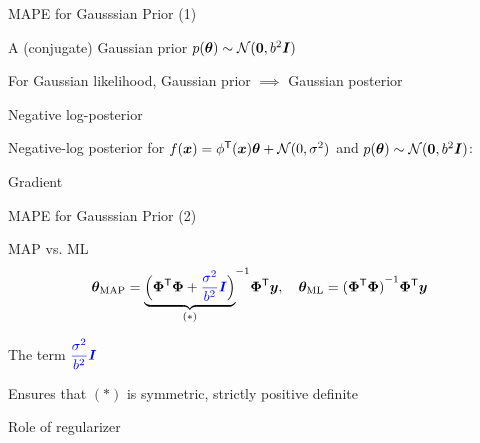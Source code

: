 \documentclass[handout,fleqn,aspectratio=169]{beamer}
\begin{document}
\begin{frame}{MAPE for Gausssian Prior (1)}

\plitemsep 0.07in

\bci 

\item \exam A (conjugate) Gaussian prior $p(\bm{\theta}) \sim \mathcal N(\bm{0}, b^2 \bm{I})$
\bci
\item For Gaussian likelihood, Gaussian prior $\implies$ Gaussian posterior
\eci

\item Negative log-posterior

\medskip
\mycolorbox
{
Negative-log posterior for $f(\bm{x}) = {\phi}^{\mathsf{T}}(\bm{x})\bm{\theta} + \mathcal N(0,\sigma^2)$ and $p(\bm{\theta}) \sim \mathcal N(\bm{0}, b^2 \bm{I})$:
\vspace{-0.1cm}
}
\item Gradient

\eci

\end{frame}

\begin{frame}{MAPE for Gausssian Prior (2)}

\plitemsep 0.1in

\bci 

\item MAP vs. ML
$$
\bm{\theta}_{\text{MAP}} = {{
\underbrace{\Big({\bm{\Phi}}^{\mathsf{T}} \bm{\Phi} + {\color{blue} \frac{\sigma^2}{b^2}\bm{I}} \Big)}_{(*)}
}^{-1}} {\bm{\Phi}}^{\mathsf{T}} \bm{y}, \quad \bm{\theta}_{\text{ML}} = {{({\bm{\Phi}}^{\mathsf{T}}\bm{\Phi})}^{-1}} {\bm{\Phi}}^{\mathsf{T}} \bm{y}
$$

\item The term ${\color{blue} \dfrac{\sigma^2}{b^2}\bm{I}}$ 
\bci
\item Ensures that $(*)$ is symmetric, strictly positive definite
\item Role of regularizer
\eci
\eci

\end{frame}
\end{document}
